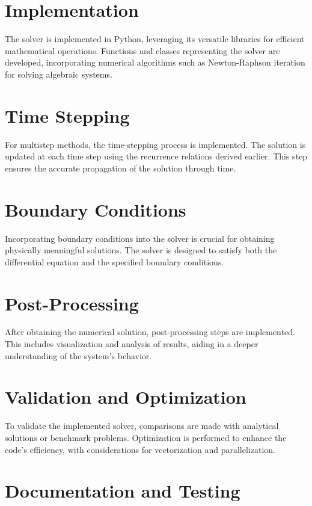\section{Implementation}

The solver is implemented in Python, leveraging its versatile libraries for efficient mathematical operations. Functions and classes representing the solver are developed, incorporating numerical algorithms such as Newton-Raphson iteration for solving algebraic systems.

\section{Time Stepping}

For multistep methods, the time-stepping process is implemented. The solution is updated at each time step using the recurrence relations derived earlier. This step ensures the accurate propagation of the solution through time.

\section{Boundary Conditions}

Incorporating boundary conditions into the solver is crucial for obtaining physically meaningful solutions. The solver is designed to satisfy both the differential equation and the specified boundary conditions.

\section{Post-Processing}

After obtaining the numerical solution, post-processing steps are implemented. This includes visualization and analysis of results, aiding in a deeper understanding of the system's behavior.

\section{Validation and Optimization}

To validate the implemented solver, comparisons are made with analytical solutions or benchmark problems. Optimization is performed to enhance the code's efficiency, with considerations for vectorization and parallelization.

\section{Documentation and Testing}

